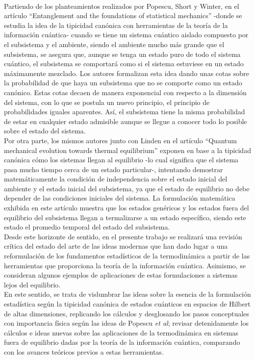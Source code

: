 \\
Partiendo de los planteamientos realizados por Popescu, Short y Winter, en el artículo “Entanglement and the foundations of statistical mechanics” \cite{Popescu2006} -donde se estudia la idea de la tipicidad canónica con herramientas de la teoría de la información cuántica- cuando se tiene un sistema cuántico aislado compuesto por el subsistema y el ambiente, siendo el ambiente mucho más grande que el subsistema, se asegura que, aunque se tenga un estado puro de todo el sistema cuántico, el subsistema se comportará como si el sistema estuviese en un estado máximamente mezclado. Los autores formalizan esta idea dando unas cotas sobre la probabilidad de que haya un subsistema que no se comporte como un estado canónico. Estas cotas decaen de manera exponencial con respecto a la dimensión del sistema, con lo que se postula un nuevo principio, el principio de probabilidades iguales aparentes. Así, el subsistema tiene la misma probabilidad de estar en cualquier estado admisible aunque se llegue a conocer todo lo posible sobre el estado del sistema.
\\
Por otra parte, los mismos autores junto con Linden en el artículo “Quantum mechanical evolution towards thermal equilibrium” \cite{LindenPaper} exponen en base a la tipicidad canónica cómo los sistemas llegan al equilibrio -lo cual significa que el sistema pasa mucho tiempo cerca de un estado particular-, intentando demostrar matemáticamente la condición de independencia sobre el estado inicial del ambiente y el estado inicial del subsistema, ya que el estado de equilibrio no debe depender de las condiciones iniciales del sistema. La formulación matemática exhibida en este artículo muestra que los estados genéricos y los estados fuera del equilibrio del subsistema llegan a termalizarse a un estado específico, siendo este estado el promedio temporal del estado del subsistema.
\\
Desde este horizonte de sentido, en el presente trabajo se realizará una revisión crítica del estado del arte de las ideas modernas que han dado lugar a una reformulación de los fundamentos estadísticos de la termodinámica a partir de las herramientas que proporciona la teoría de la información cuántica. Asimismo, se consideran algunos ejemplos de aplicaciones de estas formulaciones a sistemas lejos del equilibrio.
\\
En este sentido, se trata de vislumbrar las ideas sobre la esencia de la formulación estadística según la tipicidad canónica de estados cuánticos en espacios de Hilbert de altas dimensiones, replicando los cálculos y desglosando los pasos conceptuales con importancia física según las ideas de Popescu \textit{et al}; revisar detenidamente los cálculos e ideas nuevas sobre las aplicaciones de la termodinámica en sistemas fuera de equilibrio dadas por la teoría de la información cuántica, comparando con los avances teóricos previos a estas herramientas.
